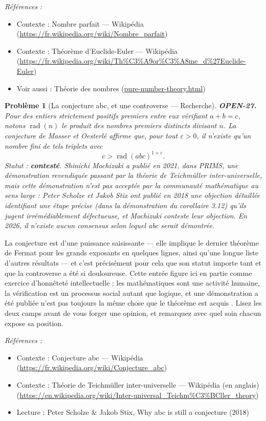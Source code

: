\documentclass[11pt]{article}
\newtheorem{problem}{Problème}
\newenvironment{refs}{\par\small\noindent\emph{Références :}\begin{itemize}\setlength\itemsep{0pt}}{\end{itemize}\normalsize}
\begin{document}
\begin{refs}
\item Contexte : Nombre parfait --- Wikipédia (\url{https://fr.wikipedia.org/wiki/Nombre_parfait})
\item Contexte : Théorème d'Euclide-Euler --- Wikipédia (\url{https://fr.wikipedia.org/wiki/Th%C3%A9or%C3%A8me_d%27Euclide-Euler})
\item Voir aussi : Théorie des nombres (\url{pure-number-theory.html})
\end{refs}

\bigskip

\begin{problem}[{La conjecture abc, et une controverse --- Recherche}]
\textbf{OPEN-27.} Pour des entiers strictement positifs premiers entre
eux vérifiant $ a + b = c $, notons $ \operatorname{rad}(n) $ le produit des nombres
premiers distincts divisant $ n $. La conjecture de Masser et Oesterlé affirme que, pour
tout $ \varepsilon > 0 $, il n'existe qu'un nombre fini de tels triplets avec
\[ c > \operatorname{rad}(abc)^{1+\varepsilon} . \]
Statut : \textbf{contesté}. Shinichi Mochizuki a publié en 2021, dans \textit{PRIMS}, une
démonstration revendiquée passant par la théorie de Teichmüller inter-universelle, mais
cette démonstration n'est pas acceptée par la communauté mathématique au sens large :
Peter Scholze et Jakob Stix ont publié en 2018 une objection détaillée identifiant une
étape précise (dans la démonstration du corollaire 3.12) qu'ils jugent irrémédiablement
défectueuse, et Mochizuki conteste leur objection. En 2026, il n'existe aucun consensus
selon lequel abc serait démontrée.
\end{problem}

\noindent La conjecture est d'une puissance saisissante --- elle implique le dernier
théorème de Fermat pour les grands exposants en quelques lignes, ainsi qu'une longue liste
d'autres résultats --- et c'est précisément pour cela que son statut importe tant et que la
controverse a été si douloureuse. Cette entrée figure ici en partie comme exercice
d'honnêteté intellectuelle : les mathématiques sont une activité humaine, la vérification
est un processus social autant que logique, et \og{} une démonstration a été publiée \fg{} n'est
pas toujours la même chose que \og{} le théorème est acquis \fg{}. Lisez les deux camps avant de
vous forger une opinion, et remarquez avec quel soin chacun expose sa position.

\begin{refs}
\item Contexte : Conjecture abc --- Wikipédia (\url{https://fr.wikipedia.org/wiki/Conjecture_abc})
\item Contexte : Théorie de Teichmüller inter-universelle --- Wikipédia (en anglais) (\url{https://en.wikipedia.org/wiki/Inter-universal_Teichm%C3%BCller_theory})
\item Lecture : Peter Scholze \& Jakob Stix, \og{} Why abc is still a conjecture \fg{} (2018)
\end{refs}
\end{document}

